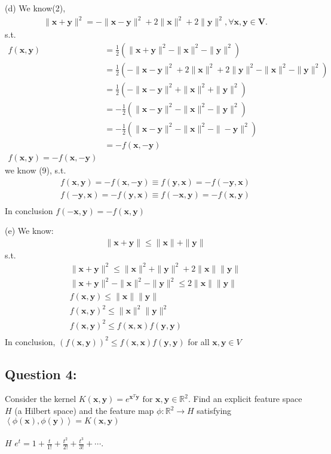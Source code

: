 \documentclass[a4paper,12pt]{article}
\newcommand{\R}{\mathbb{R}}
\begin{document}
(d)
We know(2),
\begin{align*}
    \|\bm{x} + \bm{y}\|^2 = - \|\bm{x} - \bm{y}\|^2 + 2\|\bm{x}\|^2 + 2\|\bm{y}\|^2, \forall \bm{x}, \bm{y} \in \bm{V}.
\end{align*}
s.t.
\begin{align*}
    f(\bm{x}, \bm{y}) &= \frac 1 2 (\|\bm{x} + \bm{y}\|^2 - \|\bm{x}\|^2 - \|\bm{y}\|^2) \\
    &= \frac 1 2 (- \|\bm{x} - \bm{y}\|^2 + 2\|\bm{x}\|^2 + 2\|\bm{y}\|^2 - \|\bm{x}\|^2 - \|\bm{y}\|^2 )  \\
    &= \frac 1 2 (- \|\bm{x} - \bm{y}\|^2 + \|\bm{x}\|^2 + \|\bm{y}\|^2)  \\
    &= -\frac 1 2 (\|\bm{x} - \bm{y}\|^2 - \|\bm{x}\|^2 - \|\bm{y}\|^2)  \\
    &= -\frac 1 2 (\|\bm{x} - \bm{y}\|^2 - \|\bm{x}\|^2 - \|-\bm{y}\|^2)  \\
    &= -f(\bm{x}, -\bm{y}) \\
    f(\bm{x}, \bm{y}) = -f(\bm{x}, -\bm{y})
\end{align*}
we know (9), s.t.
\begin{align*}
    f(\bm{x}, \bm{y}) = -f(\bm{x}, -\bm{y}) \equiv f(\bm{y}, \bm{x}) = -f(-\bm{y}, \bm{x})\\
    f(-\bm{y}, \bm{x}) = -f(\bm{y}, \bm{x}) \equiv f(-\bm{x}, \bm{y}) = -f(\bm{x}, \bm{y}) \\
\end{align*}
In conclusion \(f(-\bm{x}, \bm{y}) = -f(\bm{x}, \bm{y})\)

(e)
We know:
\begin{align*}
    \|\bm{x} + \bm{y}\| \leq \|\bm{x}\| + \|\bm{y}\|
\end{align*}
s.t.
\begin{align*}
    \|\bm{x} + \bm{y}\|^2 \leq \|\bm{x}\|^2 + \|\bm{y}\|^2 + 2\|\bm{x}\|\|\bm{y}\| \\
    \|\bm{x} + \bm{y}\|^2 - \|\bm{x}\|^2 - \|\bm{y}\|^2 \leq 2\|\bm{x}\|\|\bm{y}\| \\
    f(\bm{x}, \bm{y}) \leq \|\bm{x}\|\|\bm{y}\| \\
    f(\bm{x}, \bm{y})^2 \leq \|\bm{x}\|^2\|\bm{y}\|^2 \\
    f(\bm{x}, \bm{y})^2 \leq f(\bm{x}, \bm{x})f(\bm{y}, \bm{y}) \\
\end{align*}
In conclusion, \((f(\bm{x}, \bm{y}))^2 \leq f(\bm{x}, \bm{x})f(\bm{y}, \bm{y})\) for all \(\bm{x}, \bm{y} \in V\)

\subsection*{Question 4:}
Consider the kernel \(K(\bm{x}, \bm{y}) = e^{\bm{x}^T\bm{y}} \text{ for } \bm{x}, \bm{y} \in \R^2\). 
Find an explicit feature space \(H\) (a Hilbert space)  
and the feature map \(\phi : \R^2 \to H\)  
satisfying \(\left< \phi(\bm{x}), \phi(\bm{y})\right> = K(\bm{x}, \bm{y}) \) \\ 
 \\
\(H\)  
\(e^t = 1 + \frac{t}{1!} + \frac{t^2}{2!} + \frac{t^3}{3!} + \cdots.\)
\end{document}
